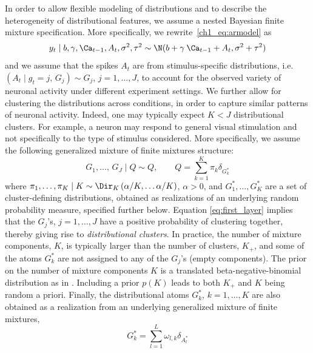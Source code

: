 In order to allow flexible modeling of distributions and to describe the heterogeneity of distributional features, we assume a nested Bayesian finite mixture specification. More specifically, we rewrite~\eqref{ch1_eq:armodel} as
\begin{equation*}
y_t\mid b, \gamma, \Ca_{t-1}, A_t, \sigma^2, \tau^2 \sim \N(b+\gamma\:\Ca_{t-1} + A_t, \sigma^2 + \tau^2 )
\end{equation*}
and we assume that the spikes $A_t$ are from stimulus-specific distributions, i.e. 
$ (A_t \mid g_t = j, \, G_j) \sim G_j$, $ j=1, \ldots, J$,
to account for the observed variety of neuronal activity under different experiment settings. We further allow for clustering the distributions across conditions, in order to capture similar patterns of neuronal activity. Indeed, one may typically expect $K<J$ distributional clusters. For example, a neuron may respond to general visual stimulation and not specifically to the type of stimulus considered. More specifically, we assume the following generalized mixture of finite mixtures structure:
%
\begin{equation}
G_1,\dots,\,G_J \mid Q \sim Q, \qquad Q = \sum_{k=1}^{K} \pi_k \delta_{G^*_k}
\label{eq:first_layer}
\end{equation}
where \(\pi_1,\dots,\pi_K \mid K \sim \Dir_K\left(\alpha/K, \ldots \alpha/K\right)\), $\alpha>0$, and $G_1^*, \ldots, G_K^*$ are a set of cluster-defining distributions, obtained as realizations of an underlying random probability measure, specified further below. Equation \eqref{eq:first_layer} implies that the $G_j$'s, $j=1,\ldots, J$ have a positive probability of clustering together, thereby giving rise to \textit{distributional clusters}. In practice, the number of mixture components, $K$, is typically larger than the number of clusters, $K_+$, and some of the atoms $G_k^*$ are not assigned to any of the $G_j$'s (empty components). The prior on the number of mixture components $K$ is a translated beta-negative-binomial distribution as in \textcite{fruhwirthschnatter2020}. 
Including a prior $p(K)$ leads to both $K_+$ and $K$ being random a priori. 
Finally, the distributional atoms $G_k^*$, $k=1, \ldots, K$ are also obtained as a realization from an underlying generalized mixture of finite mixtures, 
\begin{equation}
G^*_k = \sum_{l=1}^{L} \omega_{l,k} \delta_{A^*_l}
\label{eq:second_layer}
\end{equation}
